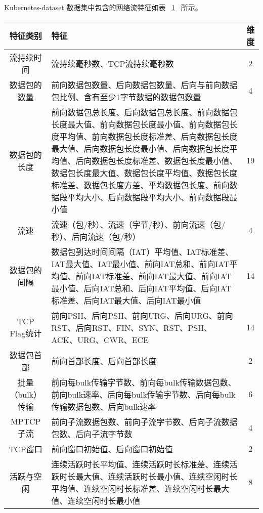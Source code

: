 {Kubernetes-dataset 数据集中包含的网络流特征如表 ~\ref{tab:dataset-features}~ 所示。

\begin{table}[!htbp]
    \label{tab:dataset-features}
    \centering
    \footnotesize%
    \setlength{\tabcolsep}{4pt}%
    \renewcommand{\arraystretch}{1.2}%
    \begin{tabular}{cp{10cm}c}
        \hline
        特征类别 & 特征 & 维度\\
        \hline
        流持续时间 & 流持续毫秒数、TCP流持续毫秒数 & 2\\
        数据包的数量 & 前向数据包数量、后向数据包数量、后向与前向数据包比例、含有至少1字节数据的数据包数量 & 4\\
        数据包的长度 & 前向数据包总长度、后向数据包总长度、前向数据包长度最大值、前向数据包长度最小值、前向数据包长度平均值、前向数据包长度标准差、后向数据包长度最大值、后向数据包长度最小值、后向数据包长度平均值、后向数据包长度标准差、数据包长度最小值、数据包长度最大值、数据包长度平均值、数据包长度标准差、数据包长度方差、平均数据包长度、前向数据段平均大小、后向数据段平均大小、前向数据段最小值 & 19\\
        流速 & 流速（包/秒）、流速（字节/秒）、前向流速（包/秒）、后向流速（包/秒）& 4\\
        数据包的间隔 & 数据包到达时间间隔（IAT）平均值、IAT标准差、IAT最大值、IAT最小值、前向IAT总和、前向IAT平均值、前向IAT标准差、前向IAT最大值、前向IAT最小值、后向IAT总和、后向IAT平均值、后向IAT标准差、后向IAT最大值、后向IAT最小值 & 14\\
        TCP Flag统计 & 前向PSH、后向PSH、前向URG、后向URG、前向RST、后向RST、FIN、SYN、RST、PSH、ACK、URG、CWR、ECE & 14\\
        数据包首部 & 前向首部长度、后向首部长度 & 2\\
        批量（bulk）传输 & 前向每bulk传输字节数、前向每bulk传输数据包数、前向bulk速率、后向每bulk传输字节数、后向每bulk传输数据包数、后向bulk速率	& 6\\
        MPTCP子流 & 前向子流数据包数、前向子流字节数、后向子流数据包数、后向子流字节数	& 4\\
        TCP窗口 & 前向窗口初始值、后向窗口初始值 & 2\\
        活跃与空闲 & 连续活跃时长平均值、连续活跃时长标准差、连续活跃时长最大值、连续活跃时长最小值、连续空闲时长平均值、连续空闲时长标准差、连续空闲时长最大值、连续空闲时长最小值 & 8\\
        \hline
    \end{tabular}
\end{table}

}
